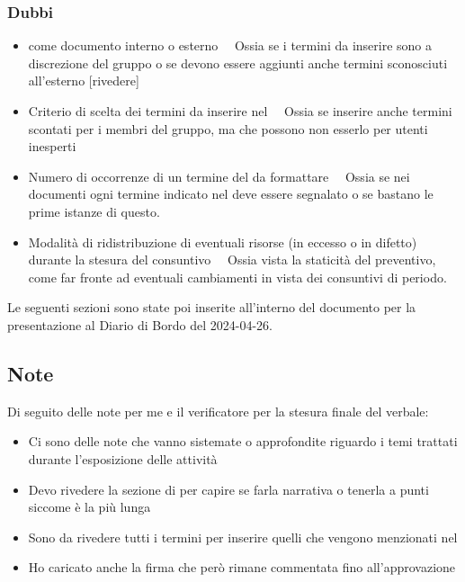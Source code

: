 \subsubsection{Dubbi}
\begin{itemize}
	\item \Glossario come documento interno o esterno \ \rightarrow\ Ossia se i termini da inserire sono a discrezione del gruppo o se devono essere aggiunti anche termini sconosciuti all'esterno [rivedere]
	\item Criterio di scelta dei termini da inserire nel \Glossario \ \rightarrow\ Ossia se inserire anche termini scontati per i membri del gruppo, ma che possono non esserlo per utenti inesperti
	\item Numero di occorrenze di un termine del \Glossario da formattare \ \rightarrow\ Ossia se nei documenti ogni termine indicato nel \Glossario deve essere segnalato o se bastano le prime istanze di questo.
	\item Modalità di ridistribuzione di eventuali risorse (in eccesso o in difetto) durante la stesura del consuntivo \ \rightarrow\ Ossia vista la staticità del preventivo, come far fronte ad eventuali cambiamenti in vista dei consuntivi di periodo.
\end{itemize}
\par Le seguenti sezioni sono state poi inserite all'interno del documento per la presentazione al Diario di Bordo del 2024-04-26.

\newpage
\subsection{Note}
\par Di seguito delle note per me e il verificatore per la stesura finale del verbale:
\begin{itemize}
	\item Ci sono delle note che vanno sistemate o approfondite riguardo i temi trattati durante l'esposizione delle attività
	\item Devo rivedere la sezione di \marco  per capire se farla narrativa o tenerla a punti siccome è la più lunga
	\item Sono da rivedere tutti i termini per inserire quelli che vengono menzionati nel \Glossario
  \item Ho caricato anche la firma che però rimane commentata fino all'approvazione
\end{itemize}